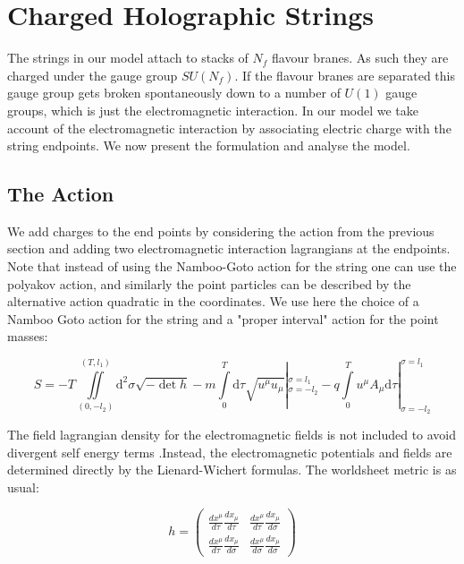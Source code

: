 \documentclass[11pt,a4paper]{article}
\begin{document}
\FloatBarrier
\section{Charged Holographic Strings}

The strings in our model attach to stacks of $N_f$ flavour branes. As such they are charged under the gauge group $SU(N_f)$. If the flavour branes are separated this gauge group gets broken spontaneously down to a number of $U(1)$ gauge groups, which is just the electromagnetic interaction. In our model we take account of the electromagnetic interaction by associating electric charge with the string endpoints. We now present the formulation and analyse the model.

\FloatBarrier
\subsection{The Action}

We add charges to the end points by considering the action from the previous section and adding two electromagnetic interaction lagrangians at the endpoints. Note that instead of using the Namboo-Goto action for the string one can use the polyakov action, and similarly the point particles can be described by the alternative action quadratic in the coordinates. We use here the choice of a Namboo Goto action for the string and a "proper interval" action for the point masses:

\begin{equation}
S=-T\iint\limits_{(0,-l_{2})}^{(T,l_{1})}\mathrm{d}^{2}\sigma\sqrt{-\det h}-m\int\limits_{0}^{T}\mathrm{d}\tau\sqrt{u^{\mu}u_{\mu}}|_{\sigma=-l_{2}}^{\sigma=l_{1}}-q\int\limits_{0}^{T}u^{\mu}A_{\mu}\mathrm{d}\tau|_{\sigma=-l_{2}}^{\sigma=l_{1}}
\end{equation}

The field lagrangian density for the electromagnetic fields is not included to avoid divergent self energy terms .Instead, the electromagnetic potentials and fields are determined directly by the Lienard-Wichert formulas. The worldsheet metric is as usual:

\begin{equation*}
h=
\begin{pmatrix}
\frac{dx^{\mu}}{d\tau}\frac{dx_{\mu}}{d\tau} & \frac{dx^{\mu}}{d\tau}\frac{dx_{\mu}}{d\sigma}\\
\frac{dx^{\mu}}{d\tau}\frac{dx_{\mu}}{d\sigma} & \frac{dx^{\mu}}{d\sigma}\frac{dx_{\mu}}{d\sigma}\end{pmatrix}
\end{equation*} 
\end{document}
